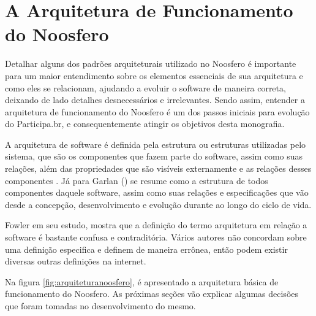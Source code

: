 \section{A Arquitetura de Funcionamento do Noosfero}

Detalhar alguns dos padrões arquiteturais utilizado no Noosfero é importante para um maior entendimento sobre os elementos essenciais de sua arquitetura e como eles se relacionam, ajudando a evoluir o software de maneira correta, deixando de lado detalhes desnecessários e irrelevantes. Sendo assim, entender a arquitetura de funcionamento do Noosfero é um dos passos iniciais para evolução do Participa.br, e consequentemente atingir os objetivos desta monografia.

A arquitetura de software é definida pela estrutura ou estruturas utilizadas pelo sistema, que são os componentes que fazem parte do software, assim como suas relações, além das propriedades que são visíveis externamente e as relações desses componentes \cite{bass1998architecture}. Já para Garlan (\citeyear{garlan1995architecture}) se resume como a estrutura de todos componentes  daquele software, assim como suas relações e especificações que vão desde a concepção, desenvolvimento e evolução durante ao longo do ciclo de vida.


Fowler \citeyear{fowler2006padroes} em seu estudo, mostra que a definição do termo arquitetura em relação a software é bastante confusa e contraditória. Vários autores não concordam sobre uma definição especifica e definem de maneira errônea, então podem existir diversas outras definições na internet.

Na figura \ref{fig:arquiteturanoosfero}, é apresentado a arquitetura básica de funcionamento do Noosfero. As próximas seções vão explicar algumas decisões que foram tomadas no desenvolvimento do mesmo.

